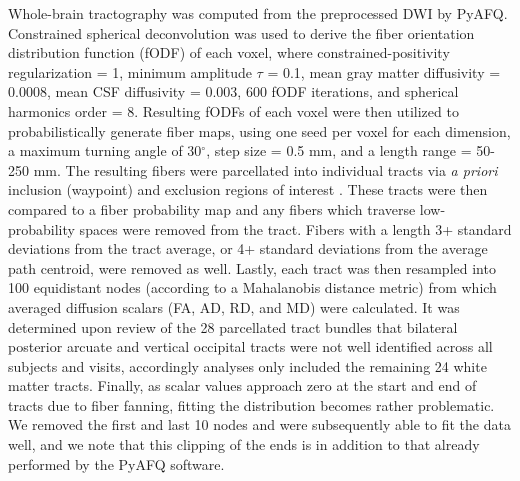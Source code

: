 \documentclass[]{imag-ms-template}
\begin{document}
Whole-brain tractography was computed from the preprocessed DWI by PyAFQ. Constrained spherical deconvolution was used to derive the fiber orientation distribution function (fODF) of each voxel, where constrained-positivity regularization = 1, minimum amplitude $\tau$ = 0.1, mean gray matter diffusivity = 0.0008, mean CSF diffusivity = 0.003, 600 fODF iterations, and spherical harmonics order = 8. Resulting fODFs of each voxel were then utilized to probabilistically generate fiber maps, using one seed per voxel for each dimension, a maximum turning angle of 30$^\circ$, step size = 0.5 mm, and a length range = 50-250 mm. The resulting fibers were parcellated into individual tracts via \textit{a priori} inclusion (waypoint) and exclusion regions of interest \parencite{wakana2007ReproducibilityQuantitativeTractography}. These tracts were then compared to a fiber probability map \parencite{hua2008TractProbabilityMaps} and any fibers which traverse low-probability spaces were removed from the tract. Fibers with a length 3+ standard deviations from the tract average, or 4+ standard deviations from the average path centroid, were removed as well. Lastly, each tract was then resampled into 100 equidistant nodes (according to a Mahalanobis distance metric) from which averaged diffusion scalars (FA, AD, RD, and MD) were calculated. It was determined upon review of the 28 parcellated tract bundles that bilateral posterior arcuate and vertical occipital tracts were not well identified across all subjects and visits, accordingly analyses only included the remaining 24 white matter tracts. Finally, as scalar values approach zero at the start and end of tracts due to fiber fanning, fitting the distribution becomes rather problematic. We removed the first and last 10 nodes and were subsequently able to fit the data well, and we note that this clipping of the ends is in addition to that already performed by the PyAFQ software.
\end{document}
